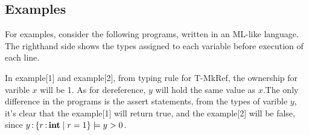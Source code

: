 \documentclass[runningheads]{llncs}
\begin{document}
\subsection{Examples}
For examples, consider the following programs, written in an ML-like language.
The righthand side shows the types assigned to each variable before execution of
each line.
\begin{parcolumns}{2}
\colplacechunks
\end{parcolumns}

\begin{parcolumns}{2}
\colplacechunks
\end{parcolumns}

In example[1] and example[2], from typing rule for T-MkRef, the ownership for varible $x$ will be 1.
As for dereference, $y$ will hold the same value as $x$.The only difference in the programs is the
assert statements, from the types of varible $y$, it's clear that the example[1] will return true,
and the example[2] will be false, since $y \operatorname{:} \left\{{r \operatorname{:} \mathbf{int} \mid r = 1}\right\} \models y > 0$.

\begin{parcolumns}{2}
\colplacechunks
\end{parcolumns}
\end{document}
